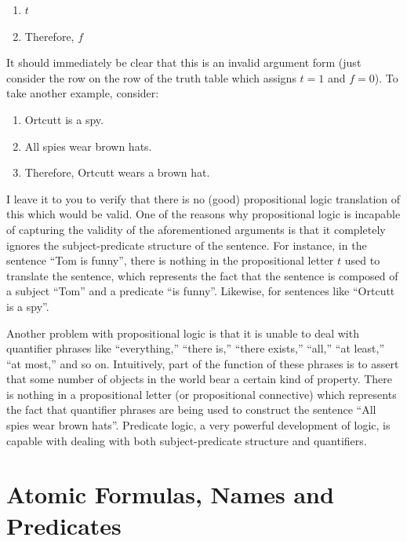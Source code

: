\documentclass[
]{book}
\providecommand{\tightlist}{%
  \setlength{\itemsep}{0pt}\setlength{\parskip}{0pt}}
\begin{document}
\begin{enumerate}
\def\labelenumi{\arabic{enumi}.}
\tightlist
\item
  \(t\)
\item
  Therefore, \(f\)
\end{enumerate}

It should immediately be clear that this is an invalid argument form (just consider the row on the row of the truth table which assigns \(t = 1\) and \(f = 0\)). To take another example, consider:

\begin{enumerate}
\def\labelenumi{\arabic{enumi}.}
\tightlist
\item
  Ortcutt is a spy.
\item
  All spies wear brown hats.
\item
  Therefore, Ortcutt wears a brown hat.
\end{enumerate}

I leave it to you to verify that there is no (good) propositional logic translation of this which would be valid. One of the reasons why propositional logic is incapable of capturing the validity of the aforementioned arguments is that it completely ignores the subject-predicate structure of the sentence. For instance, in the sentence ``Tom is funny'', there is nothing in the propositional letter \(t\) used to translate the sentence, which represents the fact that the sentence is composed of a subject ``Tom'' and a predicate ``is funny''. Likewise, for sentences like ``Ortcutt is a spy''.

Another problem with propositional logic is that it is unable to deal with quantifier phrases like ``everything,'' ``there is,'' ``there exists,'' ``all,'' ``at least,'' ``at most,'' and so on. Intuitively, part of the function of these phrases is to assert that some number of objects in the world bear a certain kind of property. There is nothing in a propositional letter (or propositional connective) which represents the fact that quantifier phrases are being used to construct the sentence ``All spies wear brown hats''. Predicate logic, a very powerful development of logic, is capable with dealing with both subject-predicate structure and quantifiers.

\hypertarget{atomic-formulas-names-and-predicates}{%
\section{Atomic Formulas, Names and Predicates}\label{atomic-formulas-names-and-predicates}}
\end{document}
